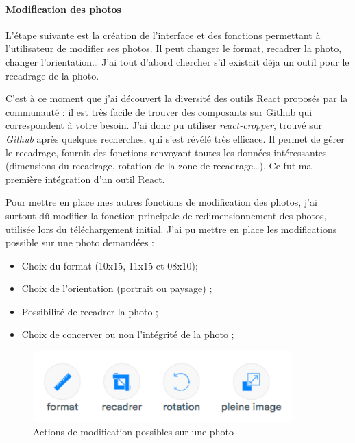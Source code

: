 \bigskip

\paragraph{Modification des photos}\label{modification-des-photos}

\bigskip

L'étape suivante est la création de l'interface et des fonctions
permettant à l'utilisateur de modifier ses photos. Il peut changer le
format, recadrer la photo, changer l'orientation\ldots{} J'ai tout
d'abord chercher s'il existait déja un outil pour le recadrage de la
photo.

\bigskip

C'est à ce moment que j'ai découvert la diversité des outils React
proposés par la communauté : il est très facile de trouver des
composants sur Github qui correspondent à votre besoin. J'ai donc pu
utiliser
\href{https://github.com/roadmanfong/react-cropper}{\emph{react-cropper}},
trouvé sur \emph{Github} après quelques recherches, qui s'est révélé
très efficace. Il permet de gérer le recadrage, fournit des fonctions
renvoyant toutes les données intéressantes (dimensions du recadrage,
rotation de la zone de recadrage\ldots{}). Ce fut ma première
intégration d'un outil React.

\bigskip

Pour mettre en place mes autres fonctions de modification des photos,
j'ai surtout dû modifier la fonction principale de redimensionnement des
photos, utilisée lors du téléchargement initial. J'ai pu mettre en place
les modifications possible sur une photo demandées :

\begin{itemize}
\tightlist
\item
  Choix du format (10x15, 11x15 et 08x10);
\item
  Choix de l'orientation (portrait ou paysage) ;
\item
  Possibilité de recadrer la photo ;
\item
  Choix de concerver ou non l'intégrité de la photo ;
\end{itemize}

\begin{figure}[h]
  \centering
  \includegraphics[width=10cm]{figures/photolix-1.png}
  \caption{Actions de modification possibles sur une photo}
\end{figure}

